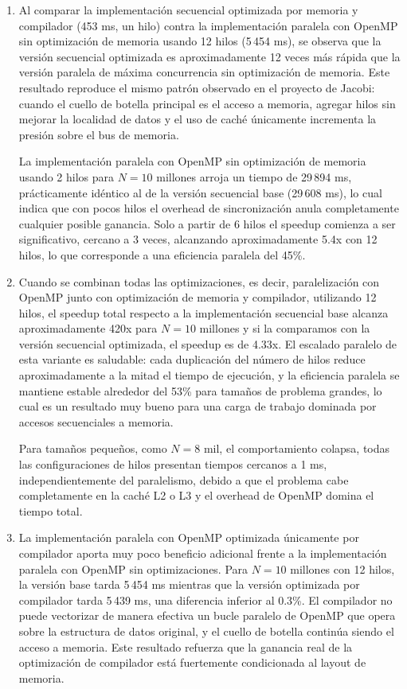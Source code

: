 \begin{enumerate}
\item
Al comparar la implementación secuencial optimizada por memoria y compilador (453 ms, un hilo) contra la implementación paralela con OpenMP sin optimización de memoria usando 12 hilos (5\,454 ms), se observa que la versión secuencial optimizada es aproximadamente 12 veces más rápida que la versión paralela de máxima concurrencia sin optimización de memoria. Este resultado reproduce el mismo patrón observado en el proyecto de Jacobi: cuando el cuello de botella principal es el acceso a memoria, agregar hilos sin mejorar la localidad de datos y el uso de caché únicamente incrementa la presión sobre el bus de memoria.

La implementación paralela con OpenMP sin optimización de memoria usando 2 hilos para $N=10$ millones arroja un tiempo de 29\,894 ms, prácticamente idéntico al de la versión secuencial base (29\,608 ms), lo cual indica que con pocos hilos el overhead de sincronización anula completamente cualquier posible ganancia. Solo a partir de 6 hilos el speedup comienza a ser significativo, cercano a 3 veces, alcanzando aproximadamente 5.4x con 12 hilos, lo que corresponde a una eficiencia paralela del 45\%.

\item
Cuando se combinan todas las optimizaciones, es decir, paralelización con OpenMP junto con optimización de memoria y compilador, utilizando 12 hilos, el speedup total respecto a la implementación secuencial base alcanza aproximadamente 420x para $N=10$ millones y si la comparamos con la versión secuencial optimizada, el speedup es de 4.33x. El escalado paralelo de esta variante es saludable: cada duplicación del número de hilos reduce aproximadamente a la mitad el tiempo de ejecución, y la eficiencia paralela se mantiene estable alrededor del 53\% para tamaños de problema grandes, lo cual es un resultado muy bueno para una carga de trabajo dominada por accesos secuenciales a memoria.

Para tamaños pequeños, como $N=8$ mil, el comportamiento colapsa, todas las configuraciones de hilos presentan tiempos cercanos a 1 ms, independientemente del paralelismo, debido a que el problema cabe completamente en la caché L2 o L3 y el overhead de OpenMP domina el tiempo total.

\item
La implementación paralela con OpenMP optimizada únicamente por compilador aporta muy poco beneficio adicional frente a la implementación paralela con OpenMP sin optimizaciones. Para $N=10$ millones con 12 hilos, la versión base tarda 5\,454 ms mientras que la versión optimizada por compilador tarda 5\,439 ms, una diferencia inferior al 0.3\%. El compilador no puede vectorizar de manera efectiva un bucle paralelo de OpenMP que opera sobre la estructura de datos original, y el cuello de botella continúa siendo el acceso a memoria. Este resultado refuerza que la ganancia real de la optimización de compilador está fuertemente condicionada al layout de memoria.


\end{enumerate}
